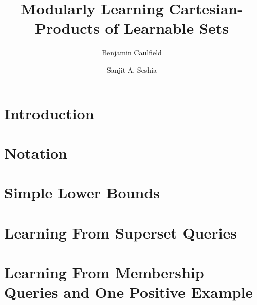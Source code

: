 

\title{Modularly Learning Cartesian-Products of Learnable Sets}
\author{Benjamin Caulfield}
\author{Sanjit A. Seshia}
\address{Electrical Engineering and Computer Science\\ University of California, Berkeley}



\maketitle

\begin{abstract}

\end{abstract}

\section{Introduction}


\section{Notation}



\section{Simple Lower Bounds}


\section{Learning From Superset Queries}

\section{Learning From Membership Queries and One Positive Example}


